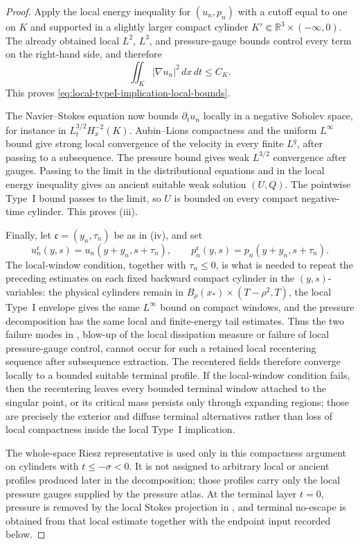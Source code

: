 \documentclass[11pt]{amsart}
\numberwithin{equation}{section}
\theoremstyle{plain}
\theoremstyle{definition}
\theoremstyle{remark}
\newcommand{\R}{\mathbb R}
\begin{document}
\begin{proof}
Apply the local energy inequality for \((u_n,p_n)\) with a cutoff equal to one
on \(K\) and supported in a slightly larger compact cylinder
\(K'\Subset\R^3\times(-\infty,0)\).  The already obtained local \(L^2\),
\(L^3\), and pressure-gauge bounds control every term on the right-hand side,
and therefore
\[
   \iint_K |\nabla u_n|^2\,dx\,dt\le C_K .
\]
This proves \eqref{eq:local-typeI-implication-local-bounds}.

The Navier--Stokes equation now bounds \(\partial_tu_n\) locally in a negative
Sobolev space, for instance in \(L^{3/2}_tH^{-2}_x(K)\).  Aubin--Lions
compactness and the uniform \(L^\infty\) bound give strong local convergence of
the velocity in every finite \(L^q\), after passing to a subsequence.  The
pressure bound gives weak \(L^{3/2}\) convergence after gauges.  Passing to the
limit in the distributional equations and in the local energy inequality gives
an ancient suitable weak solution \((U,Q)\).  The pointwise Type~I bound passes
to the limit, so \(U\) is bounded on every compact negative-time cylinder.
This proves (iii).

Finally, let \(\mathfrak c=(y_n,\tau_n)\) be as in (iv), and set
\[
   u_n^{\mathfrak c}(y,s)=u_n(y+y_n,s+\tau_n),
   \qquad
   p_n^{\mathfrak c}(y,s)=p_n(y+y_n,s+\tau_n).
\]
The local-window condition, together with \(\tau_n\le0\), is what is
needed to repeat the preceding estimates on each fixed backward compact cylinder
in the \((y,s)\)-variables: the
physical cylinders remain in \(B_\rho(x_*)\times(T-\rho^2,T)\), the local
Type~I envelope gives the same \(L^\infty\) bound on compact windows, and the
pressure decomposition has the same local and finite-energy tail estimates.
Thus the two failure modes in , blow-up of the
local dissipation measure or failure of local pressure-gauge control, cannot
occur for such a retained local recentering sequence after subsequence
extraction.  The recentered fields therefore converge locally to a bounded
suitable terminal profile.  If the local-window condition fails, then the
recentering leaves every bounded terminal window attached to the singular
point, or its critical mass persists only through expanding regions; those are
precisely the exterior and diffuse terminal alternatives rather than loss of
local compactness inside the local Type~I implication.

The whole-space Riesz representative is used only in this compactness argument
on cylinders with \(t\le-\sigma<0\).  It is not assigned to arbitrary local or
ancient profiles produced later in the decomposition; those profiles carry
only the local pressure gauges supplied by the pressure atlas.  At the terminal
layer \(t=0\), pressure is removed by the local Stokes projection in
, and terminal no-escape is
obtained from that local estimate together with the endpoint input recorded
below.
\end{proof}
\end{document}
